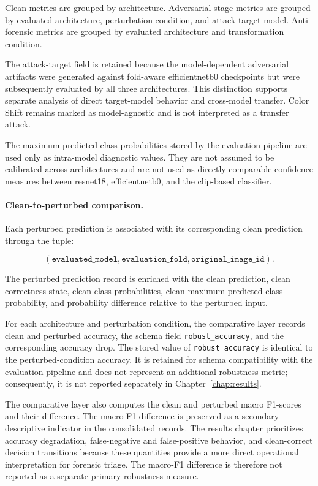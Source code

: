Clean metrics are grouped by architecture. Adversarial-stage metrics are
grouped by evaluated architecture, perturbation condition, and attack target
model. Anti-forensic metrics are grouped by evaluated architecture and
transformation condition.

The attack-target field is retained because the model-dependent adversarial
artifacts were generated against fold-aware \gls{efficientnetb0} checkpoints but
were subsequently evaluated by all three architectures. This distinction
supports separate analysis of direct target-model behavior and cross-model
transfer. Color Shift remains marked as model-agnostic and is not interpreted
as a transfer attack.

The maximum predicted-class probabilities stored by the evaluation pipeline are
used only as intra-model diagnostic values. They are not assumed to be
calibrated across architectures and are not used as directly comparable
confidence measures between \gls{resnet18}, \gls{efficientnetb0}, and the
\gls{clip}-based classifier.

\paragraph{Clean-to-perturbed comparison.}

Each perturbed prediction is associated with its corresponding clean prediction
through the tuple:

\[
\left(
\texttt{evaluated\_model},
\texttt{evaluation\_fold},
\texttt{original\_image\_id}
\right).
\]

The perturbed prediction record is enriched with the clean prediction, clean
correctness state, clean class probabilities, clean maximum predicted-class
probability, and probability difference relative to the perturbed input.

For each architecture and perturbation condition, the comparative layer
records clean and perturbed accuracy, the schema field
\texttt{robust\_accuracy}, and the corresponding accuracy drop. The stored
value of \texttt{robust\_accuracy} is identical to the perturbed-condition
accuracy. It is retained for schema compatibility with the evaluation pipeline
and does not represent an additional robustness metric; consequently, it is
not reported separately in Chapter~\ref{chap:results}.

The comparative layer also computes the clean and perturbed macro F1-scores and
their difference. The macro-F1 difference is preserved as a secondary
descriptive indicator in the consolidated records. The results chapter
prioritizes accuracy degradation, false-negative and false-positive behavior,
and clean-correct decision transitions because these quantities provide a more
direct operational interpretation for forensic triage. The macro-F1 difference
is therefore not reported as a separate primary robustness measure.

